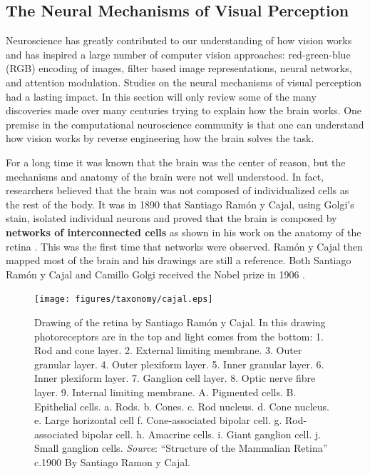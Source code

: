 

\subsection{The Neural Mechanisms of Visual Perception}

Neuroscience has greatly contributed to our understanding of how vision works and has inspired a large number of computer vision approaches: red-green-blue (RGB) encoding of images, filter based image representations, neural networks, and attention modulation. Studies on the neural mechanisms of visual perception had a lasting impact. In this section will only review some of the many discoveries made over many centuries trying to explain how the brain works. One premise in the computational neuroscience community is that one can understand how vision works by reverse engineering how the brain solves the task.

For a long time it was known that the brain was the center of reason, but the mechanisms and anatomy of the brain were not well understood. In fact, researchers believed that the brain was not composed of individualized cells as the rest of the body. 
It was in 1890 that Santiago Ram\'{o}n y Cajal, using Golgi's stain, 
isolated individual neurons and proved that the brain is composed by {\bf networks of interconnected cells} as shown in his work on the anatomy of the retina \cite{cajal1893retine}. This was the first time that networks were observed. Ram\'{o}n y Cajal then mapped most of the brain and his drawings are still a reference. Both Santiago Ram\'{o}n y Cajal and Camillo Golgi received the Nobel prize in 1906 \cite{Glickstein2006}. 


\begin{figure}
\centerline{
\texttt{[image: figures/taxonomy/cajal.eps]}
} 
\caption{Drawing of the retina by Santiago Ram\'{o}n y Cajal. In this drawing photoreceptors are in the top and light comes from the bottom: 
 1. Rod and cone layer. 2. External limiting membrane. 3. Outer granular layer. 4. Outer plexiform layer. 5. Inner granular layer. 6. Inner plexiform layer. 7. Ganglion cell layer. 8. Optic nerve fibre layer. 9. Internal limiting membrane. A. Pigmented cells. B. Epithelial cells. a. Rods. b. Cones. c. Rod nucleus. d. Cone nucleus. e. Large horizontal cell f. Cone-associated bipolar cell. g. Rod-associated bipolar cell. h. Amacrine cells. i. Giant ganglion cell. j. Small ganglion cells.  
{\em Source}: ``Structure of the Mammalian Retina'' c.1900 By Santiago Ramon y Cajal.} 
\label{fig:cajal}
\end{figure}


